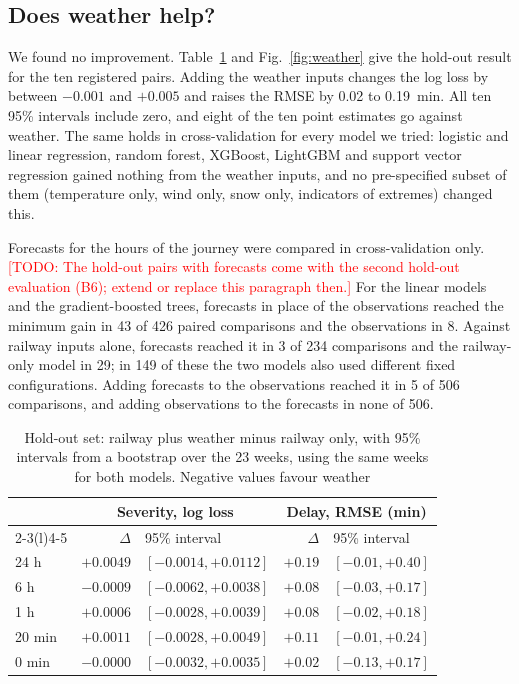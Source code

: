 \documentclass[conference]{IEEEtran}
\newcommand{\todo}[1]{\textcolor{red}{[TODO: #1]}}
\begin{document}
\subsection{Does weather help?}

We found no improvement. Table~\ref{tab:weather} and Fig.~\ref{fig:weather} give the hold-out
result for the ten registered pairs. Adding the weather inputs changes the log loss by between $-0.001$ and $+0.005$
and raises the RMSE by 0.02 to 0.19~min. All ten 95\% intervals include zero, and eight of the ten
point estimates go against weather. The same holds in cross-validation for every model we tried:
logistic and linear regression, random forest, XGBoost, LightGBM and support vector regression
gained nothing from the weather inputs, and no pre-specified subset of them (temperature only, wind
only, snow only, indicators of extremes) changed this.

Forecasts for the hours of the journey were compared in cross-validation only.\todo{The hold-out
pairs with forecasts come with the second hold-out evaluation (B6); extend or replace this paragraph then.} For the linear models and
the gradient-boosted trees, forecasts in place of the observations reached the minimum gain in 43
of 426 paired comparisons and the observations in 8. Against railway inputs alone, forecasts reached
it in 3 of 234 comparisons and the railway-only model in 29; in 149 of these the two models also
used different fixed configurations. Adding forecasts to the observations reached it in 5 of 506
comparisons, and adding observations to the forecasts in none of 506.

\begin{table}[t]
\caption{Hold-out set: railway plus weather minus railway only, with 95\% intervals from a
bootstrap over the 23 weeks, using the same weeks for both models. Negative values favour weather}
\label{tab:weather}
\centering
\footnotesize
\setlength{\tabcolsep}{3.5pt}
\begin{tabular}{@{}lrlrl@{}}
\toprule
 & \multicolumn{2}{c}{Severity, log loss} & \multicolumn{2}{c}{Delay, RMSE (min)} \\
\cmidrule(lr){2-3}\cmidrule(l){4-5}
 & $\Delta$ & 95\% interval & $\Delta$ & 95\% interval \\
\midrule
24 h & $+0.0049$ & $[-0.0014, +0.0112]$ & $+0.19$ & $[-0.01, +0.40]$ \\
6 h & $-0.0009$ & $[-0.0062, +0.0038]$ & $+0.08$ & $[-0.03, +0.17]$ \\
1 h & $+0.0006$ & $[-0.0028, +0.0039]$ & $+0.08$ & $[-0.02, +0.18]$ \\
20 min & $+0.0011$ & $[-0.0028, +0.0049]$ & $+0.11$ & $[-0.01, +0.24]$ \\
0 min & $-0.0000$ & $[-0.0032, +0.0035]$ & $+0.02$ & $[-0.13, +0.17]$ \\
\bottomrule
\end{tabular}
\end{table}
\end{document}
